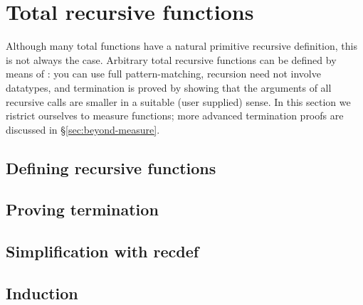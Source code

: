\section{Total recursive functions}
\label{sec:recdef}

Although many total functions have a natural primitive recursive definition,
this is not always the case. Arbitrary total recursive functions can be
defined by means of : you can use full pattern-matching,
recursion need not involve datatypes, and termination is proved by showing
that the arguments of all recursive calls are smaller in a suitable (user
supplied) sense. In this section we ristrict ourselves to measure functions;
more advanced termination proofs are discussed in {\S}\ref{sec:beyond-measure}.

\subsection{Defining recursive functions}
\label{sec:recdef-examples}


\subsection{Proving termination}



\subsection{Simplification with recdef}
\label{sec:recdef-simplification}



\subsection{Induction}


\label{sec:recdef-induction}

